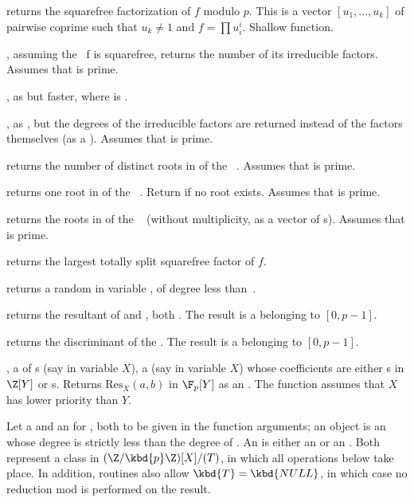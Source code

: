  returns the squarefree
factorization of $f$ modulo $p$. This is a vector $[u_1,\dots,u_k]$
of pairwise coprime  such that $u_k \neq 1$ and $f = \prod u_i^i$.
Shallow function.

, assuming the ~f is squarefree,
returns the number of its irreducible factors. Assumes that  is prime.

, as
 but faster,
where  is .

, as , but the
degrees of the irreducible factors are returned instead of the factors
themselves (as a ). Assumes that  is prime.

 returns the number of distinct
roots in  of the ~. Assumes that  is prime.

 returns one root in  of
the ~. Return  if no root exists.
Assumes that  is prime.

 returns the roots in  of
the ~ (without multiplicity, as a vector of s).
Assumes that  is prime.

 returns the largest totally split
squarefree factor of $f$.

 returns a random 
in variable , of degree less than~.

 returns the resultant
of  and , both . The result is a 
belonging to $[0,p-1]$.

 returns the discriminant
of the  . The result is a  belonging to $[0,p-1]$.

,  a  of
s (say in variable $X$),  a  (say in variable $X$)
whose coefficients are either s in $\Z[Y]$ or s.
Returns $\text{Res}_X(a, b)$ in $\F_p[Y]$ as an . The function
assumes that $X$ has lower priority than $Y$.

 Let  a  and  an
 for , both to be given in the function arguments; an 
object is an  whose degree is strictly less than the degree of
. An  is either an  or an . Both represent
a class in $(\Z/\kbd{p}\Z)[X] / (T)$, in which all operations below take
place. In addition,  routines also allow $\kbd{T} = \kbd{NULL}$, in
which case no reduction mod  is performed on the result.

